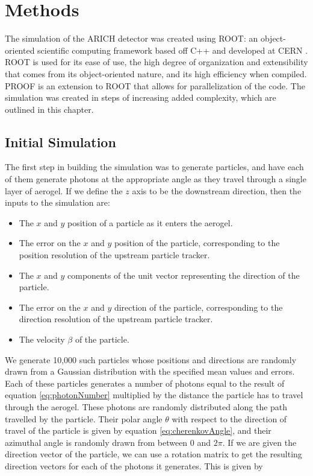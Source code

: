 
\chapter{Methods}
\label{ch:Methods}

The simulation of the ARICH detector was created using \textsc{ROOT}: an object-oriented scientific computing framework based off C++ and developed at CERN \cite{root}.
\textsc{ROOT} is used for its ease of use, the high degree of organization and extensibility that comes from its object-oriented nature, and its high efficiency when compiled.
\textsc{PROOF} is an extension to \textsc{ROOT} that allows for parallelization of the code. The simulation was created in steps of increasing added complexity, which are outlined in this chapter.


\section{Initial Simulation}
\label{sec:experiment}
The first step in building the simulation was to generate particles, and have each of them generate photons at the appropriate angle as they travel through a single layer of aerogel. If we define the $z$ axis to be the downstream direction, then the inputs to the simulation are:
\begin{itemize}
\item The $x$ and $y$ position of a particle as it enters the aerogel.
\item The error on the $x$ and $y$ position of the particle, corresponding to the position resolution of the upstream particle tracker.
\item The $x$ and $y$ components of the unit vector representing the direction of the particle.
\item The error on the $x$ and $y$ direction of the particle, corresponding to the direction resolution of the upstream particle tracker.
\item The velocity $\beta$ of the particle.
\end{itemize} 
We generate 10,000 such particles whose positions and directions are randomly drawn from a Gaussian distribution with the specified mean values and errors. 
Each of these particles generates a number of photons equal to the result of equation \ref{eq:photonNumber} multiplied by the distance the particle has to travel through the aerogel.
These photons are randomly distributed along the path travelled by the particle. Their polar angle $\theta$ with respect to the direction of travel of the particle is given by equation \ref{eq:cherenkovAngle}, and their azimuthal angle is randomly drawn from between 0 and $2\pi$. 
If we are given the direction vector of the particle, we can use a rotation matrix to get the resulting direction vectors for each of the photons it generates.
This is given by 


